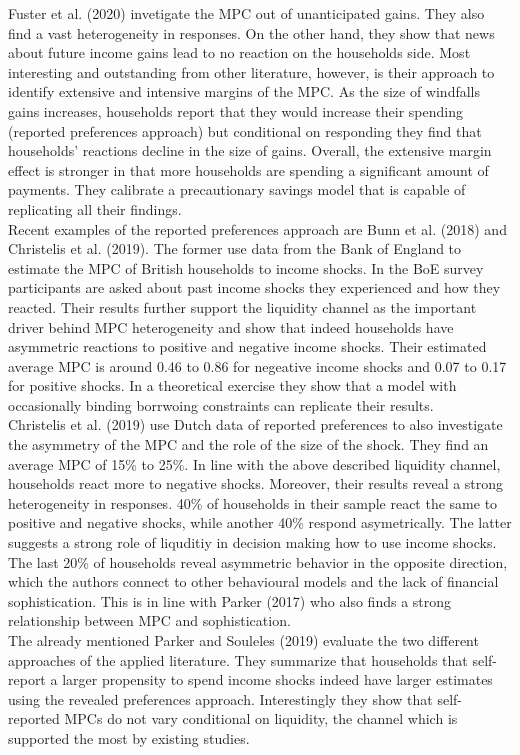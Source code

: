 Fuster et al. (2020) invetigate the MPC out of unanticipated gains. They also find a vast heterogeneity in responses. On the other hand, they show that news about future income gains lead to no reaction on the households side. Most interesting and outstanding from other literature, however, is their approach to identify extensive and intensive margins of the MPC. As the size of windfalls gains increases, households report that they would increase their spending (reported preferences approach) but conditional on responding they find that households' reactions decline in the size of gains. Overall, the extensive margin effect is stronger in that more households are spending a significant amount of payments. They calibrate a precautionary savings model that is capable of replicating all their findings. \\
Recent examples of the reported preferences approach are Bunn et al. (2018) and Christelis et al. (2019). The former use data from the Bank of England to estimate the MPC of British households to income shocks. In the BoE survey participants are asked about past income shocks they experienced and how they reacted. Their results further support the liquidity channel as the important driver behind MPC heterogeneity and show that indeed households have asymmetric reactions to positive and negative income shocks. Their estimated average MPC is around 0.46 to 0.86 for negeative income shocks and 0.07 to 0.17 for positive shocks. In a theoretical exercise they show that a model with occasionally binding borrwoing constraints can replicate their results.\\
Christelis et al. (2019) use Dutch data of reported preferences to also investigate the asymmetry of the MPC and the role of the size of the shock. They find an average MPC of 15\% to 25\%. In line with the above described liquidity channel, households react more to negative shocks. Moreover, their results reveal a strong heterogeneity in responses. 40\% of households in their sample react the same to positive and negative shocks, while another 40\% respond asymetrically. The latter suggests a strong role of liquditiy in decision making how to use income shocks. The last 20\% of households reveal asymmetric behavior in the opposite direction, which the authors connect to other behavioural models and the lack of financial sophistication. This is in line with Parker (2017) who also finds a strong relationship between MPC and sophistication. \\
The already mentioned Parker and Souleles (2019) evaluate the two different approaches of the applied literature. They summarize that households that self-report a larger propensity to spend income shocks indeed have larger estimates using the revealed preferences approach. Interestingly they show that self-reported MPCs do not vary conditional on liquidity, the channel which is supported the most by existing studies. \\
